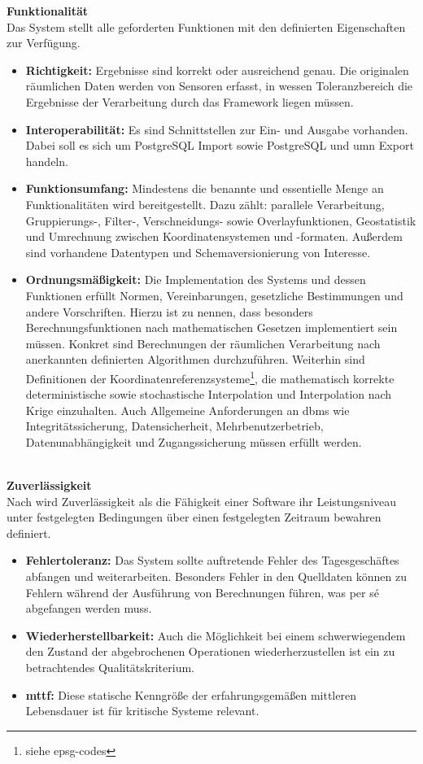 \textbf{Funktionalität}\\
Das System stellt alle geforderten Funktionen mit den definierten Eigenschaften zur Verfügung.
\begin{itemize}
\item \textbf{Richtigkeit:} Ergebnisse sind korrekt oder ausreichend genau.
Die originalen räumlichen Daten werden von Sensoren erfasst, in wessen Toleranzbereich die Ergebnisse der Verarbeitung durch das Framework liegen müssen.
\item \textbf{Interoperabilität:} Es sind Schnittstellen zur Ein- und Ausgabe vorhanden. Dabei soll es sich um PostgreSQL Import sowie PostgreSQL und \Gls{umn} Export handeln.
\item \textbf{Funktionsumfang:} Mindestens die benannte und essentielle Menge an Funktionalitäten wird bereitgestellt. Dazu zählt:
parallele Verarbeitung, Gruppierungs-, Filter-, Verschneidungs- sowie Overlayfunktionen, Geostatistik und Umrechnung zwischen Koordinatensystemen und -formaten. Außerdem sind vorhandene Datentypen und Schemaversionierung von Interesse.
\item \textbf{Ordnungsmäßigkeit:} Die Implementation des Systems und dessen Funktionen erfüllt Normen, Vereinbarungen, gesetzliche Bestimmungen und andere Vorschriften. Hierzu ist zu nennen, dass besonders Berechnungsfunktionen nach mathematischen Gesetzen implementiert sein müssen. Konkret sind Berechnungen der räumlichen Verarbeitung nach anerkannten definierten Algorithmen durchzuführen. Weiterhin sind Definitionen der Koordinatenreferenzsysteme\footnote{siehe \Glspl{epsg-code}}, die mathematisch korrekte deterministische sowie stochastische Interpolation und Interpolation nach Krige einzuhalten. Auch Allgemeine Anforderungen an \Gls{dbms} wie Integritätssicherung, Datensicherheit, Mehrbenutzerbetrieb, Datenunabhängigkeit und Zugangssicherung müssen erfüllt werden.
\end{itemize}
\ \\
%
\textbf{Zuverlässigkeit}\\
Nach \cite[S.259]{book:lehrbuchsoftware} wird Zuverlässigkeit als die Fähigkeit einer Software ihr Leistungsniveau unter festgelegten Bedingungen über einen festgelegten Zeitraum bewahren definiert.
\begin{itemize}
\item \textbf{Fehlertoleranz:} Das System sollte auftretende Fehler des Tagesgeschäftes abfangen und weiterarbeiten. Besonders Fehler in den Quelldaten können zu Fehlern während der Ausführung von Berechnungen führen, was per s\'{e} abgefangen werden muss.
\item \textbf{Wiederherstellbarkeit:} Auch die Möglichkeit bei einem schwerwiegendem den Zustand der abgebrochenen Operationen wiederherzustellen ist ein zu betrachtendes Qualitätskriterium.
\item \textbf{\Gls{mttf}:} Diese statische Kenngröße der erfahrungsgemäßen mittleren Lebensdauer ist für kritische Systeme relevant.
\end{itemize}
